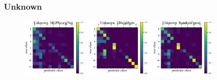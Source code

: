 \subsubsection{Unknown}
\label{sec:mystery}

\begin{figure}
	\begin{center}
		\includegraphics[width=0.3\textwidth]{./fig/Unknown_MLPNeuralNet_cm.png}
		\includegraphics[width=0.3\textwidth]{./fig/Unknown_KNeighbors_cm.png}
		\includegraphics[width=0.3\textwidth]{./fig/Unknown_RandomForest_cm.png}
		\caption{}
		\label{fig:unknown_cm}
	\end{center}
\end{figure}
